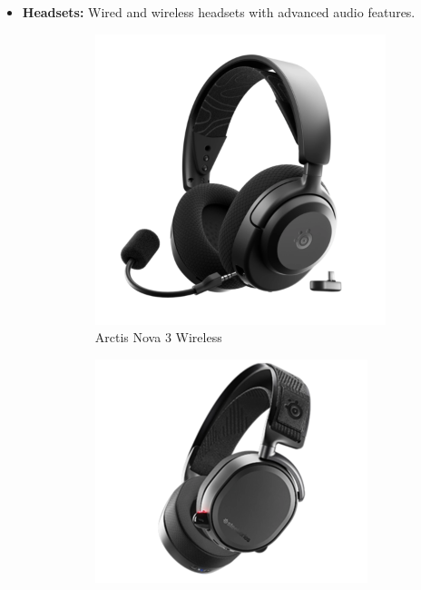 \begin{itemize}
\begin{figure}[h!]
    \end{figure}
    \item \textbf{Headsets:} Wired and wireless headsets with advanced audio features.
    \begin{figure}[h!]
    \centering
    \begin{subfigure}[b]{0.25\textwidth}
        \includegraphics[width=\textwidth]{ressources/hs_2.png}
        \caption{Arctis Nova 3 Wireless}
    \end{subfigure}
    \hfill
    \begin{subfigure}[b]{0.25\textwidth}
        \includegraphics[width=\textwidth]{ressources/hs_3.png}

\end{subfigure}
\end{figure}
\end{itemize}
